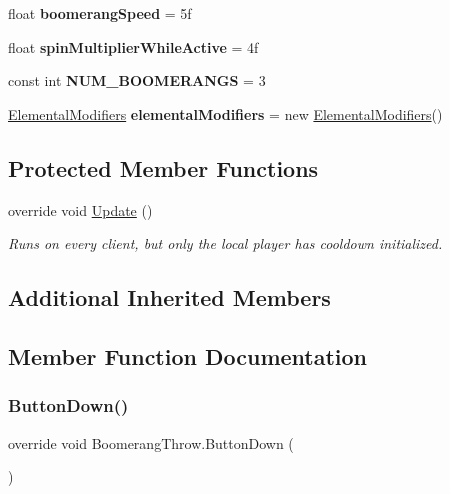 \begin{DoxyCompactItemize}
\hypertarget{class_boomerang_throw_a55e9146e2124aa33c971537fc3a2803b}{}\label{class_boomerang_throw_a55e9146e2124aa33c971537fc3a2803b} 
float {\bfseries boomerang\+Speed} = 5f
\item 
\hypertarget{class_boomerang_throw_a6ed0633866a38af89cc6050f6665c30b}{}\label{class_boomerang_throw_a6ed0633866a38af89cc6050f6665c30b} 
float {\bfseries spin\+Multiplier\+While\+Active} = 4f
\item 
\hypertarget{class_boomerang_throw_a671435e2d6fda58264f9acb1c24cb9b4}{}\label{class_boomerang_throw_a671435e2d6fda58264f9acb1c24cb9b4} 
const int {\bfseries N\+U\+M\+\_\+\+B\+O\+O\+M\+E\+R\+A\+N\+GS} = 3
\item 
\hypertarget{class_boomerang_throw_a407d3d318f1f8491bbc95e8763c5e987}{}\label{class_boomerang_throw_a407d3d318f1f8491bbc95e8763c5e987} 
\hyperlink{class_elemental_modifiers}{Elemental\+Modifiers} {\bfseries elemental\+Modifiers} = new \hyperlink{class_elemental_modifiers}{Elemental\+Modifiers}()
\end{DoxyCompactItemize}
\subsection*{Protected Member Functions}
\begin{DoxyCompactItemize}
\item 
override void \hyperlink{class_boomerang_throw_a2388db1d5710a58189134f8359da2bc1}{Update} ()
\begin{DoxyCompactList}\small\item\em Runs on every client, but only the local player has cooldown initialized. \end{DoxyCompactList}\end{DoxyCompactItemize}
\subsection*{Additional Inherited Members}


\subsection{Member Function Documentation}
\hypertarget{class_boomerang_throw_a69416792bf4c3cb495d6d99ef4341fd3}{}\label{class_boomerang_throw_a69416792bf4c3cb495d6d99ef4341fd3} 
\subsubsection{\texorpdfstring{Button\+Down()}{ButtonDown()}}
{\footnotesize\ttfamily override void Boomerang\+Throw.\+Button\+Down (\begin{DoxyParamCaption}{ }\end{DoxyParamCaption})\hspace{0.3cm}{\ttfamily [virtual]}}




